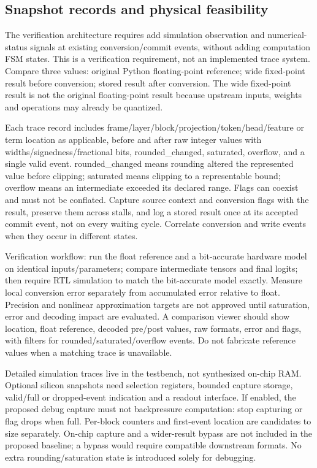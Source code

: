 \documentclass[11pt,a4paper]{article}
\begin{document}
\subsection{Snapshot records and physical feasibility}
The verification architecture requires add simulation observation and numerical-status signals at existing conversion/commit events, without adding computation FSM states. This is a verification requirement, not an implemented trace system. Compare three values: original Python floating-point reference; wide fixed-point result before conversion; stored result after conversion. The wide fixed-point result is not the original floating-point result because upstream inputs, weights and operations may already be quantized.

Each trace record includes frame/layer/block/projection/token/head/feature or term location as applicable, before and after raw integer values with widths/signedness/fractional bits, rounded\_changed, saturated, overflow, and a single valid event. rounded\_changed means rounding altered the represented value before clipping; saturated means clipping to a representable bound; overflow means an intermediate exceeded its declared range. Flags can coexist and must not be conflated. Capture source context and conversion flags with the result, preserve them across stalls, and log a stored result once at its accepted commit event, not on every waiting cycle. Correlate conversion and write events when they occur in different states.

Verification workflow: run the float reference and a bit-accurate hardware model on identical inputs/parameters; compare intermediate tensors and final logits; then require RTL simulation to match the bit-accurate model exactly. Measure local conversion error separately from accumulated error relative to float. Precision and nonlinear approximation targets are not approved until saturation, error and decoding impact are evaluated. A comparison viewer should show location, float reference, decoded pre/post values, raw formats, error and flags, with filters for rounded/saturated/overflow events. Do not fabricate reference values when a matching trace is unavailable.

Detailed simulation traces live in the testbench, not synthesized on-chip RAM. Optional silicon snapshots need selection registers, bounded capture storage, valid/full or dropped-event indication and a readout interface. If enabled, the proposed debug capture must not backpressure computation: stop capturing or flag drops when full. Per-block counters and first-event location are candidates to size separately. On-chip capture and a wider-result bypass are not included in the proposed baseline; a bypass would require compatible downstream formats. No extra rounding/saturation state is introduced solely for debugging.
\end{document}
